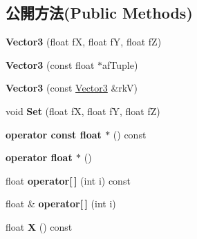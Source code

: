 \subsection*{公開方法(Public Methods)}
\begin{DoxyCompactItemize}
\item 
{\bfseries Vector3} (float fX, float fY, float fZ)\hypertarget{class_magnum_1_1_vector3_a5bc5e7ee3cf741fa30384c474b17dba7}{}\label{class_magnum_1_1_vector3_a5bc5e7ee3cf741fa30384c474b17dba7}

\item 
{\bfseries Vector3} (const float $\ast$af\+Tuple)\hypertarget{class_magnum_1_1_vector3_aadb756fd80716da5a4cbe594cabebe22}{}\label{class_magnum_1_1_vector3_aadb756fd80716da5a4cbe594cabebe22}

\item 
{\bfseries Vector3} (const \hyperlink{class_magnum_1_1_vector3}{Vector3} \&rkV)\hypertarget{class_magnum_1_1_vector3_a5803db0541eeb95271c10e9881cb20cc}{}\label{class_magnum_1_1_vector3_a5803db0541eeb95271c10e9881cb20cc}

\item 
void {\bfseries Set} (float fX, float fY, float fZ)\hypertarget{class_magnum_1_1_vector3_a2185b9508e34bcda209a8455beed04f1}{}\label{class_magnum_1_1_vector3_a2185b9508e34bcda209a8455beed04f1}

\item 
{\bfseries operator const float $\ast$} () const \hypertarget{class_magnum_1_1_vector3_a1ef77371e5d2faa26089483887fa1dac}{}\label{class_magnum_1_1_vector3_a1ef77371e5d2faa26089483887fa1dac}

\item 
{\bfseries operator float $\ast$} ()\hypertarget{class_magnum_1_1_vector3_a0b4555775747900a43b53fd9f7ae189a}{}\label{class_magnum_1_1_vector3_a0b4555775747900a43b53fd9f7ae189a}

\item 
float {\bfseries operator\mbox{[}$\,$\mbox{]}} (int i) const \hypertarget{class_magnum_1_1_vector3_a0d64c3c06eb072dc7e5a12893cf360e9}{}\label{class_magnum_1_1_vector3_a0d64c3c06eb072dc7e5a12893cf360e9}

\item 
float \& {\bfseries operator\mbox{[}$\,$\mbox{]}} (int i)\hypertarget{class_magnum_1_1_vector3_a2c0b1d67d00bce2cb51d5c67f8dac0f7}{}\label{class_magnum_1_1_vector3_a2c0b1d67d00bce2cb51d5c67f8dac0f7}

\item 
float {\bfseries X} () const \hypertarget{class_magnum_1_1_vector3_a348e37d97e4a17685d6d48c08f69794f}{}\label{class_magnum_1_1_vector3_a348e37d97e4a17685d6d48c08f69794f}


\end{DoxyCompactItemize}
